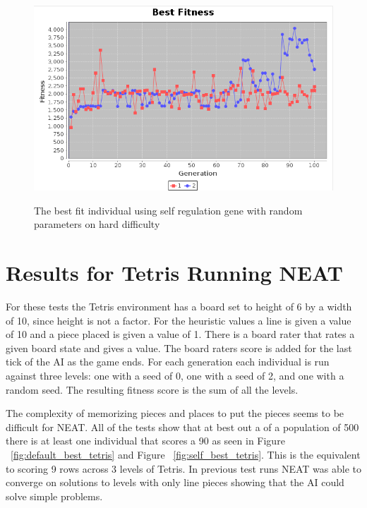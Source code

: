 \documentclass[12pt]{ucthesis} \newif\ifpdf \ifx\pdfoutput\undefined
\begin{document}
\begin{figure}[h!]
  \caption{The best fit individual using self regulation gene with random
  parameters on hard difficulty}
  \centering
    \includegraphics[width=1\textwidth]{graphsone/selfreg_random_best.png}
   \label{fig:selfreg_random_hard_best} 
\end{figure}


\section{Results for Tetris Running NEAT}
For these tests the Tetris environment has a board set to height of 6 by a width
of 10, since height is not a factor. For the heuristic values a line is given a
value of 10 and a piece placed is given a value of 1. There is a board rater
that rates a given board state and gives a value. The board raters score is
added for the last tick of the AI as the game ends. For each generation each
individual is run against three levels: one with a seed of 0, one with a seed of
2, and one with a random seed. The resulting fitness score is the sum of all the
levels.

The complexity of memorizing pieces and places to put the pieces seems to be
difficult for NEAT. All of the tests show that at best out a of a population of
500 there is at least one individual that scores a 90 as seen in
Figure ~\ref{fig:default_best_tetris} and Figure ~\ref{fig:self_best_tetris}. This is the 
equivalent to scoring 9 rows across 3 levels of Tetris. In previous test runs
NEAT was able to converge on solutions to levels with only line pieces showing
that the AI could solve simple problems.
\end{document}
